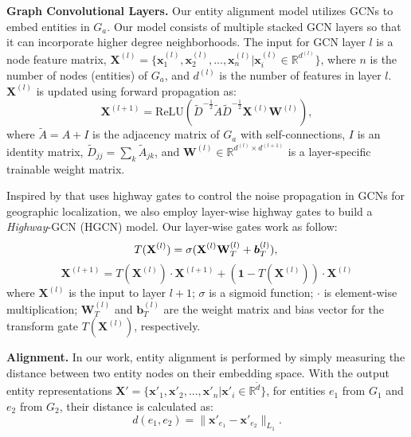 \documentclass[11pt,a4paper]{article}
\newcommand\cparagraph[1]{\vspace{1mm}\noindent\textbf{#1.}}
\begin{document}
\cparagraph{Graph Convolutional Layers} Our entity alignment model utilizes GCNs to embed entities in $G_a$. Our model consists of multiple
stacked GCN layers so that it can incorporate higher degree neighborhoods. The input for GCN layer $l$ is a node feature matrix, $\textbf{X}^{(l)}
=\{\bm{x}^{(l)}_1,\bm{x}^{(l)}_2,...,\bm{x}^{(l)}_{n} |\bm{x}^{(l)}_{i} \in \mathbb{R}^{d^{(l)}}\}$, where $n$ is the number of nodes (entities) of $G_a$, and
$d^{(l)}$ is the number of features in layer $l$. $\textbf{X}^{(l)}$ is updated using forward propagation as:
\begin{equation}
\textbf{X}^{(l+1)} = \mathrm{ReLU}(\tilde{D}^{- \frac{1}{2}}\tilde{A}\tilde{D}^{- \frac{1}{2}}\textbf{X}^{(l)}\textbf{W}^{(l)}),
\end{equation}
where $\tilde{A}=A+I$ is the adjacency matrix of $G_a$ with self-connections, $I$ is an identity matrix,
$\tilde{D}_{jj}=\sum_k\tilde{A}_{jk}$, and $\textbf{W}^{(l)} \in \mathbb{R}^{d^{(l)}
	\times d^{(l+1)}}$ is a layer-specific trainable weight matrix.


Inspired by \cite{Rahimi2018Semi} that uses highway gates \cite{Srivastava2015Highway} to control the noise propagation in GCNs for geographic localization, we also employ layer-wise highway gates to build a \emph{Highway}-GCN
(HGCN) model. Our layer-wise gates work as follow:
\begin{equation}
T(\textbf{X}^{(l)})=\sigma(\textbf{X}^{(l)}\textbf{W}_T^{(l)}+\bm{b}_T^{(l)}),\\
\end{equation}
\begin{equation}
\textbf{X}^{(l+1)}= T(\textbf{X}^{(l)}) \cdot \textbf{X}^{(l+1)}+(\textbf{1}-T(\textbf{X}^{(l)})) \cdot \textbf{X}^{(l)}
\end{equation}
where $\textbf{X}^{(l)}$ is the input to layer $l+1$; $\sigma$ is a sigmoid function; $\cdot$ is element-wise multiplication; $\textbf{W}_T^{(l)}$ and $\bm{b}_T^{(l)}$ are the weight matrix and bias vector for the transform gate $T(\textbf{X}^{(l)})$,
respectively.


\cparagraph{Alignment\label{prediction}} In our work, entity alignment is performed by simply measuring the distance between two entity nodes on their embedding space.
With the output entity representations
$\textbf{X}' = \{\bm{x}'_1,\bm{x}'_2,...,\bm{x}'_n|\bm{x}'_{i} \in \mathbb{R}^{\tilde{d}}\}$, for entities $e_1$ from $G_1$ and $e_2$ from $G_2$, their distance is
calculated as:
\begin{equation}
\label{d}
d(e_1,e_2)=\|\bm{x}'_{e_1}-\bm{x}'_{e_2}\|_{L_1}.
\end{equation}
\end{document}
